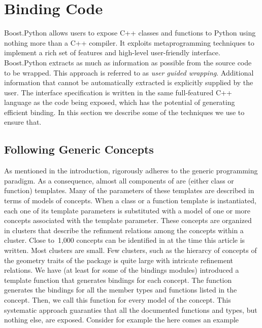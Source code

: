 \section{Binding Code}
\label{sec:code}
Boost.Python allows users to expose C++ classes and functions to
Python using nothing more than a C++ compiler. It exploits
metaprogramming techniques to implement a rich set of features and
high-level user-friendly interface. Boost.Python extracts as much as
information as possible from the source code to be wrapped. This
approach is referred to as \emph{user guided wrapping}. Additional
information that cannot be automatically extracted is explicitly
supplied by the user. The interface specification is written in the
same full-featured C++ language as the code being exposed, which has
the potential of generating efficient binding. In this section we
describe some of the techniques we use to ensure that.

\subsection{Following Generic Concepts}
\label{sec:code:concepts}
As mentioned in the introduction, \cgal{} rigorously adheres to the
generic programming paradigm. As a consequence, almost all components
of \cgal{} are (either class or function) templates. Many of the
parameters of these templates are described in terms of models of
concepts. When a class or a function template is instantiated, each
one of its template parameters is substituted with a model of one or
more concepts associated with the template parameter. These concepts
are organized in clusters that describe the refinment relations among
the concepts within a cluster. Close to~1,000 concepts can be
identified in \cgal{} at the time this article is written. Most
clusters are small. Few clusters, such as the hierarcy of concepts
of the geometry traits of the \iiDArrangementsPackage{} package is
quite large with intricate refinement relations. We have (at least
for some of the bindings modules) introduced a template function that
generates bindings for each concept. The function generates the
bindings for all the member types and functions listed in the concept.
Then, we call this function for every model of the concept. This
systematic approach guaranties that all the documented functions and
types, but nothing else, are exposed. Consider for example the
\todo here comes an example

